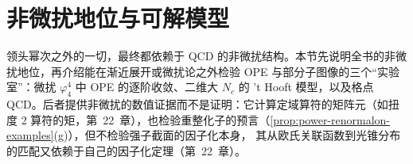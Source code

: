 \section{非微扰地位与可解模型}\label{sec:power-np}

领头幂次之外的一切，最终都依赖于 QCD 的非微扰结构。本节先说明全书的非微扰地位，再介绍能在渐近展开或微扰论之外检验 OPE 与部分子图像的三个“实验室”：微扰 $\varphi^4_4$ 中 OPE 的逐阶收敛、二维大 $N_c$ 的 't Hooft 模型，以及格点 QCD。后者提供非微扰的数值证据而不是证明：它计算定域算符的矩阵元（如扭度 2 算符的矩，第~22~章），也检验重整化子的预言（\cref{prop:power-renormalon-examples}(g)），但不检验强子截面的因子化本身，%
其从欧氏关联函数到光锥分布的匹配又依赖于自己的因子化定理（第~22~章）。

